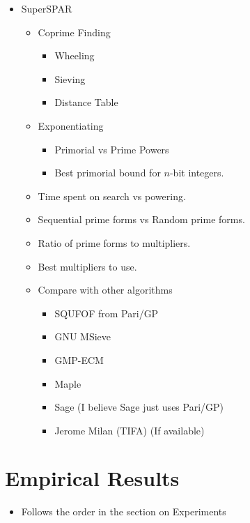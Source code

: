 \documentclass[11pt, letterpaper]{article}
\theoremstyle{definition}
\begin{document}
\begin{itemize}
\item SuperSPAR
	\begin{itemize}

	\item Coprime Finding
		\begin{itemize}
		\item Wheeling
		\item Sieving
		\item Distance Table
		\end{itemize}

	\item Exponentiating 
		\begin{itemize}
		\item Primorial vs Prime Powers
		\item Best primorial bound for $n$-bit integers.
		\end{itemize}
		
	\item Time spent on search vs powering.
	\item Sequential prime forms vs Random prime forms.
	\item Ratio of prime forms to multipliers.
	\item Best multipliers to use.
	
	\item Compare with other algorithms
		\begin{itemize}
		\item SQUFOF from Pari/GP
		\item GNU MSieve
		\item GMP-ECM
		\item Maple
		\item Sage (I believe Sage just uses Pari/GP)
		\item Jerome Milan (TIFA) (If available)
		\end{itemize}

	\end{itemize}

\end{itemize}


\bigbreak
\section{Empirical Results}

\begin{itemize}
\item Follows the order in the section on Experiments
\end{itemize}
\end{document}
